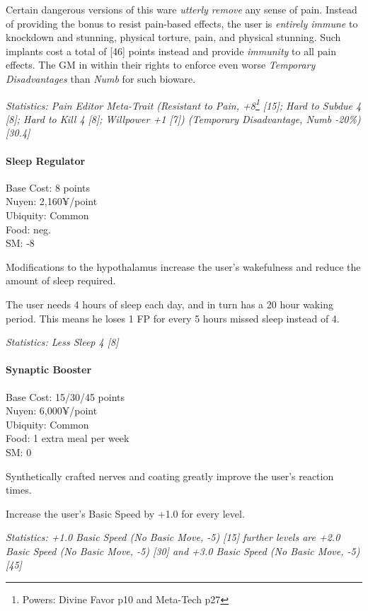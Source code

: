 \begin{multicols*}{3}
	Certain dangerous versions of this ware \textit{utterly remove} any sense of pain. Instead of providing the bonus to resist pain-based effects, the user is \textit{entirely immune} to knockdown and stunning, physical torture, pain, and physical stunning. Such implants cost a total of [46] points instead and provide \textit{immunity} to all pain effects. The GM in within their rights to enforce even worse \textit{Temporary Disadvantages} than \textit{Numb} for such bioware.

	\textit{\textcolor{OliveGreen}{Statistics: Pain Editor Meta-Trait (Resistant to Pain, +8\footnote{Powers: Divine Favor p10 and Meta-Tech p27} [15]; Hard to Subdue 4 [8]; Hard to Kill 4 [8]; Willpower +1 [7]) (Temporary Disadvantage, Numb -20\%) [30.4] }}
	
	\paragraph{Sleep Regulator}
	\begin{flushright}
		Base Cost: 8 points\\
		Nuyen: 2,160¥/point\\
		Ubiquity: Common\\
		Food: neg.\\
		SM: -8\\
	\end{flushright}
	
	Modifications to the hypothalamus increase the user's wakefulness and reduce the amount of sleep required. 
	
	The user needs 4 hours of sleep each day, and in turn has a 20 hour waking period. This means he loses 1 FP for every 5 hours missed sleep instead of 4.
	
	\textit{\textcolor{OliveGreen}{Statistics: Less Sleep 4 [8]}}
	
	\paragraph{Synaptic Booster}
	\begin{flushright}
		Base Cost: 15/30/45 points\\
		Nuyen: 6,000¥/point\\
		Ubiquity: Common\\
		Food: 1 extra meal per week\\
		SM: 0\\
	\end{flushright}
	
	Synthetically crafted nerves and coating greatly improve the user's reaction times.
	
	Increase the user's Basic Speed by +1.0 for every level.
	
	\textit{\textcolor{OliveGreen}{Statistics: +1.0 Basic Speed (No Basic Move, -5) [15] further levels are +2.0 Basic Speed (No Basic Move, -5) [30] and +3.0 Basic Speed (No Basic Move, -5) [45]}}
	
\end{multicols*}